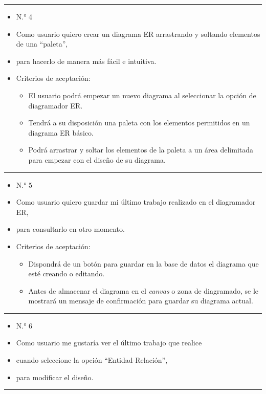\noindent\rule{\textwidth}{1pt}
\begin{itemize}
	\item N.° 4
	\item Como usuario quiero crear un diagrama ER arrastrando y soltando elementos de una ``paleta'',
	\item para hacerlo de manera más fácil e intuitiva.
	\item Criterios de aceptación:
	\begin{itemize}
		\item El usuario podrá empezar un nuevo diagrama al seleccionar la opción de diagramador ER.
		\item Tendrá a su disposición una paleta con los elementos permitidos en un diagrama ER básico.
		\item Podrá arrastrar y soltar los elementos de la paleta a un área delimitada para empezar con el diseño de su diagrama.
	\end{itemize}
\end{itemize}
\noindent\rule{\textwidth}{1pt}
\begin{itemize}
	\item N.° 5
	\item Como usuario quiero guardar mi último trabajo realizado en el diagramador ER,
	\item para consultarlo en otro momento.
	\item Criterios de aceptación:
	\begin{itemize}
		\item Dispondrá de un botón para guardar en la base de datos el diagrama que esté creando o editando.
		\item Antes de almacenar el diagrama en el \textit{canvas} o zona de diagramado, se le mostrará un mensaje de confirmación para guardar su diagrama actual.
	\end{itemize}
\end{itemize}
\noindent\rule{\textwidth}{1pt}
\begin{itemize}
	\item N.° 6
	\item Como usuario me gustaría ver el último trabajo que realice
	\item cuando seleccione la opción ``Entidad-Relación'',
	\item para modificar el diseño.
\end{itemize}
\noindent\rule{\textwidth}{1pt}
